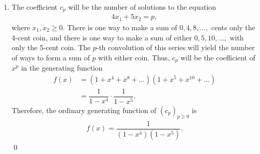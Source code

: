 \documentclass[12pt]{article}
\begin{document}
\begin{enumerate}
  \item The coefficient $c_p$ will be the number of solutions to the equation
    \begin{align*}
      4x_1 + 5x_2 = p,
    \end{align*}
    where $x_1, x_2 \geq 0.$ There is one way to make a sum of  $0,
    4, 8, \ldots,$ cents only the 4-cent coin, and there is one way
    to make a sum of either $0, 5, 10, \ldots,$ with only the 5-cent
    coin. The $p$-th convolution of this series will yield the number
    of ways to form a sum of $p$ with either coin. Thus, $c_p$ will
    be the coefficient of $x^p$ in the generating function
    \begin{align*}
      f(x) &= (1 + x^4 + x^8 + \ldots )(1 + x^5 + x^{10} + \ldots)  \\
      &= \dfrac{1}{1-x^4} \cdot \dfrac{1}{1-x^5}.
    \end{align*}
    Therefore, the ordinary generating function of $(c_p)_{p \geq 0}$ is
    \begin{align*}
      f(x) = \dfrac{1}{(1-x^4)(1-x^5)}.
    \end{align*}
    \qed
\end{enumerate}
\end{document}
